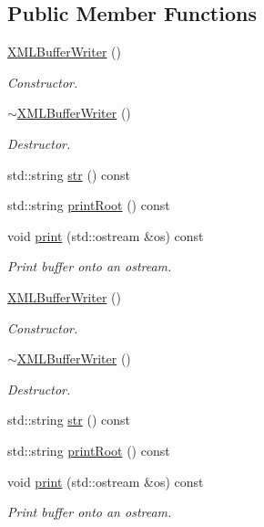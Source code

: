 \subsection*{Public Member Functions}
\begin{DoxyCompactItemize}
\item 
\mbox{\hyperlink{classADATXML_1_1XMLBufferWriter_a237df70a2c5eaf8bcc14c51ea9d4ef5a}{X\+M\+L\+Buffer\+Writer}} ()
\begin{DoxyCompactList}\small\item\em Constructor. \end{DoxyCompactList}\item 
\mbox{\hyperlink{classADATXML_1_1XMLBufferWriter_a211892bc8276e281c03174ff74f94c0f}{$\sim$\+X\+M\+L\+Buffer\+Writer}} ()
\begin{DoxyCompactList}\small\item\em Destructor. \end{DoxyCompactList}\item 
std\+::string \mbox{\hyperlink{classADATXML_1_1XMLBufferWriter_a3980a9a10a3616f76b7403c69c4006f0}{str}} () const
\item 
std\+::string \mbox{\hyperlink{classADATXML_1_1XMLBufferWriter_a323aadabc642e99d4de3f08706d918d0}{print\+Root}} () const
\item 
void \mbox{\hyperlink{classADATXML_1_1XMLBufferWriter_a1256054ea792711a5ff2807afd4f6404}{print}} (std\+::ostream \&os) const
\begin{DoxyCompactList}\small\item\em Print buffer onto an ostream. \end{DoxyCompactList}\item 
\mbox{\hyperlink{classADATXML_1_1XMLBufferWriter_a237df70a2c5eaf8bcc14c51ea9d4ef5a}{X\+M\+L\+Buffer\+Writer}} ()
\begin{DoxyCompactList}\small\item\em Constructor. \end{DoxyCompactList}\item 
\mbox{\hyperlink{classADATXML_1_1XMLBufferWriter_a211892bc8276e281c03174ff74f94c0f}{$\sim$\+X\+M\+L\+Buffer\+Writer}} ()
\begin{DoxyCompactList}\small\item\em Destructor. \end{DoxyCompactList}\item 
std\+::string \mbox{\hyperlink{classADATXML_1_1XMLBufferWriter_a12021e9b23e88cb760f4b64a8e845e5e}{str}} () const
\item 
std\+::string \mbox{\hyperlink{classADATXML_1_1XMLBufferWriter_a5eca1ff89009128d84add6150375a621}{print\+Root}} () const
\item 
void \mbox{\hyperlink{classADATXML_1_1XMLBufferWriter_a1256054ea792711a5ff2807afd4f6404}{print}} (std\+::ostream \&os) const
\begin{DoxyCompactList}\small\item\em Print buffer onto an ostream. \end{DoxyCompactList}\end{DoxyCompactItemize}
